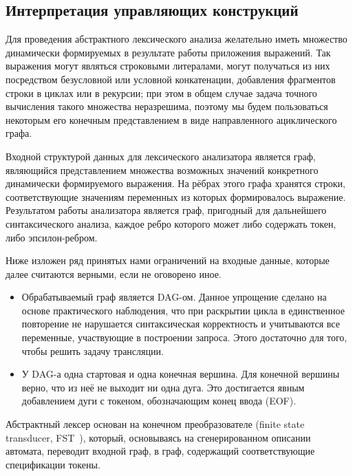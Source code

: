 \subsection{Интерпретация управляющих конструкций}
Для проведения абстрактного лексического анализа желательно иметь множество 
динамически формируемых в результате работы приложения выражений. Так выражения 
могут являться строковыми литералами, могут получаться из них посредством 
безусловной или условной конкатенации, добавления фрагментов строки в циклах 
или в рекурсии; при этом в общем случае задача точного вычисления такого множества 
неразрешима, поэтому мы будем пользоваться некоторым его конечным представлением 
в виде направленного ациклического графа.

Входной структурой данных для лексического анализатора является граф, являющийся 
представлением множества возможных значений конкретного динамически формируемого 
выражения. На рёбрах этого графа хранятся строки, соответствующие значениям 
переменных из которых формировалось выражение. Результатом работы анализатора 
является граф, пригодный для дальнейшего синтаксического анализа, каждое ребро 
которого может либо содержать токен, либо эпсилон-ребром.

Ниже изложен ряд принятых нами ограничений на входные данные, которые далее 
считаются верными, если не оговорено иное.
\begin{itemize}
    \item Обрабатываемый граф является DAG-ом. Данное упрощение сделано на 
    основе практического наблюдения, что при раскрытии цикла в единственное 
    повторение не нарушается синтаксическая корректность и учитываются все 
    переменные, участвующие в построении запроса. Этого достаточно для того, 
    чтобы решить задачу трансляции. 
    \item У DAG-а одна стартовая и одна конечная вершина. Для конечной вершины 
    верно, что из неё не выходит ни одна дуга. Это достигается явным добавлением 
    дуги с токеном, обозначающим конец ввода (EOF).
\end{itemize}

Абстрактный лексер основан на конечном преобразователе (finite state transducer, 
FST~\cite{FST}), который, основываясь на сгенерированном описании автомата, переводит 
входной граф, в граф, содержащий соответствующие спецификации токены. 

